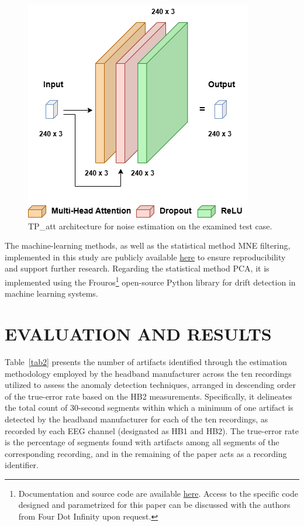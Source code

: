 \documentclass[conference]{IEEEtran}
\begin{document}
\begin{figure}
    \centering
    \includegraphics[width=0.65\columnwidth]{images/Fig3.png}
    \caption{\label{fig:Fig3} TP\_att architecture for noise estimation on the examined test case.}
\end{figure}


The machine-learning methods, as well as the statistical method MNE filtering, implemented in this study are publicly available \href{https://github.com/your-repo}{here} to ensure reproducibility and support further research. Regarding the statistical method PCA, it is implemented using the Frouros\footnote{Documentation and source code are available \href{https://github.com/IFCA-Advanced-Computing/frouros}{here}. Access to the specific code designed and parametrized for this paper can be discussed with the authors from Four Dot Infinity upon request.} open-source Python library for drift detection in machine learning systems.


\section{EVALUATION AND RESULTS}
\label{sec:results}

Table~\ref{tab2} presents the number of artifacts identified through
the estimation methodology employed by the headband manufacturer
across the ten recordings utilized to assess the anomaly detection
techniques, arranged in descending order of the true-error rate based on the HB2 measurements. Specifically, it delineates the total count of 30-second
segments within which a minimum of one artifact is detected by the
headband manufacturer for each of the ten recordings, as recorded by
each EEG channel (designated as HB1 and HB2). The true-error rate is the percentage of segments found with artifacts among all segments of the corresponding recording, and in the remaining of the paper acts as a recording identifier. 
\end{document}
